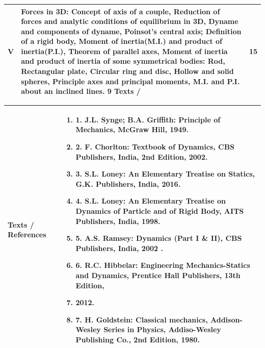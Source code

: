 \documentclass[11pt,a4paper]{article}
\begin{document}
\begin{tabularx}{\textwidth}{|>{\centering\arraybackslash}p{1.4cm}|X|>{\centering\arraybackslash}p{2.4cm}|}
\hline
\Large \textbf{V} & Forces in 3D: Concept of axis of a couple, Reduction of forces and analytic conditions of equilibrium in 3D, Dyname and components of dyname, Poinsot’s central axis; Definition of a rigid body, Moment of inertia(M.I.) and product of inertia(P.I.), Theorem of parallel axes, Moment of inertia and product of inertia of some symmetrical bodies: Rod, Rectangular plate, Circular ring and disc, Hollow and solid spheres, Principle axes and principal moments, M.I. and P.I. about an inclined lines. 9 Texts / & \Large \textbf{15} \\
\hline
\end{tabularx}
\vspace{8pt}
\renewcommand{\arraystretch}{1.3}
\begin{tabularx}{\textwidth}{|p{3.2cm}|X|}
\hline
\textbf{Texts / References} & \begin{enumerate}[leftmargin=*,noitemsep,topsep=2pt]  \item 1. J.L. Synge; B.A. Griffith: Principle of Mechanics, McGraw Hill, 1949.  \item 2. F. Chorlton: Textbook of Dynamics, CBS Publishers, India, 2nd Edition, 2002.  \item 3. S.L. Loney: An Elementary Treatise on Statics, G.K. Publishers, India, 2016.  \item 4. S.L. Loney: An Elementary Treatise on Dynamics of Particle and of Rigid Body, AITS Publishers,  India, 1998.  \item 5. A.S. Ramsey: Dynamics (Part I \& II),    CBS Publishers, India, 2002 .  \item 6. R.C. Hibbelar: Engineering Mechanics-Statics and Dynamics, Prentice Hall Publishers, 13th Edition,  \item 2012.  \item 7. H. Goldstein: Classical mechanics, Addison-Wesley Series in Physics, Addiso-Wesley Publishing Co.,    2nd Edition, 1980.\end{enumerate} \\
\hline
\end{tabularx}
\clearpage
\end{document}
